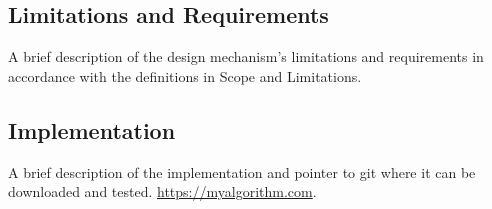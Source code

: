 \subsection{Limitations and Requirements}
A brief description of the design mechanism's limitations and requirements in accordance with the definitions in Scope and Limitations.


\subsection{Implementation}

A brief description of the implementation and pointer to git where it can be downloaded and tested. \url{https://myalgorithm.com}.
